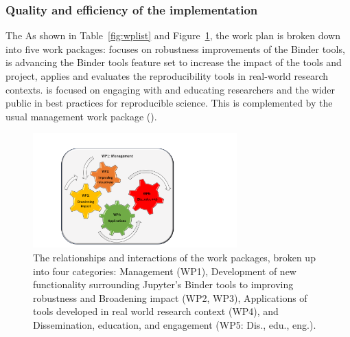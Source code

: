 

\subsubsection{Quality and efficiency of the implementation}\label{sec:workplan-structure}

\ifgrantagreement The \else As shown in Table~\ref{fig:wplist} and
Figure~\ref{fig:workpackages}, the \fi work plan is broken down into five work
packages:  focuses on robustness improvements of the
Binder tools,  is advancing the Binder tools feature set to
increase the impact of the tools and project,  applies and
evaluates the reproducibility tools in real-world research contexts.
 is focused on engaging with and educating researchers and the
wider public in best practices for reproducible science. This is complemented by
the usual management work package ().

\begin{figure}[htb]
  \centering
  \includegraphics[width=0.7\textwidth]{images/WP.pdf}
  \caption{
    \label{fig:workpackages}
    The relationships and interactions of the work packages,
    broken up into four categories: Management (WP1),
    Development of new functionality surrounding Jupyter's Binder tools to improving robustness 
    and Broadening impact (WP2, WP3),
    Applications of tools developed in real world research context (WP4),
    and Dissemination, education, and engagement (WP5: Dis., edu., eng.).
  }
\end{figure}


